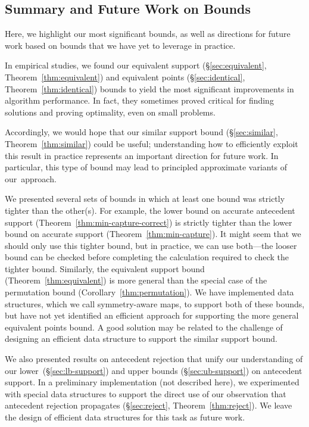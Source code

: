 \documentclass[twoside,11pt]{article}
\begin{document}
\begin{arxiv}

\section{Summary and Future Work on Bounds}
\label{sec:practical}

Here, we highlight our most significant bounds, as well as directions for future work
based on bounds that we have yet to leverage in practice.

In empirical studies, we found our equivalent support (\S\ref{sec:equivalent}, Theorem~\ref{thm:equivalent})
and equivalent points (\S\ref{sec:identical}, Theorem~\ref{thm:identical}) bounds
to yield the most significant improvements in algorithm performance.
%
In fact, they sometimes proved critical for finding solutions and proving optimality,
even on small problems.

Accordingly, we would hope that our similar support bound (\S\ref{sec:similar}, Theorem~\ref{thm:similar}) could be useful;
%
understanding how to efficiently exploit this result in practice
represents an important direction for future work. In particular, this type of bound may lead to
principled approximate variants of our~approach.

We presented several sets of bounds in which at least one bound was strictly tighter than the other(s).
%
For example, the lower bound on accurate antecedent support (Theorem~\ref{thm:min-capture-correct})
is strictly tighter than the lower bound on accurate support (Theorem~\ref{thm:min-capture}).
%
It might seem that we should only use this tighter bound, but in practice, we can use
both---the looser bound can be checked before completing the calculation required to
check the tighter bound.
%
Similarly, the equivalent support bound (Theorem~\ref{thm:equivalent})
is more general than the special case of the permutation bound (Corollary~\ref{thm:permutation}).
%
We have implemented data structures, which we call symmetry-aware maps,
to support both of these bounds, but have not yet identified an efficient approach
for supporting the more general equivalent points bound.
%
A good solution may be related to the challenge of designing an efficient data structure
to support the similar support bound.

We also presented results on antecedent rejection
that unify our understanding of our lower~(\S\ref{sec:lb-support})
and upper bounds (\S\ref{sec:ub-support}) on antecedent support.
%
In a preliminary implementation (not described here), we experimented with special data structures
to support the direct use of our observation that antecedent rejection propagates
(\S\ref{sec:reject}, Theorem~\ref{thm:reject}).
%
We leave the design of efficient data structures for this task as future work.


\end{arxiv}
\end{document}
